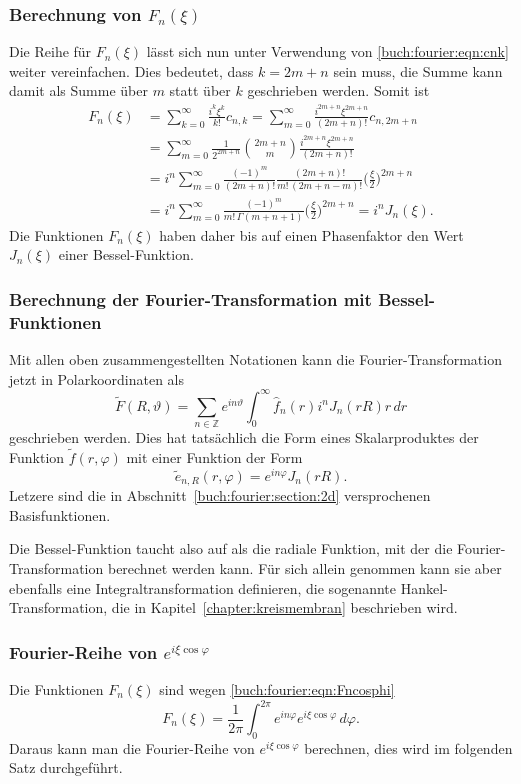 \subsubsection{Berechnung von $F_n(\xi)$}
Die Reihe für $F_n(\xi)$ lässt sich nun unter Verwendung
von \eqref{buch:fourier:eqn:cnk} weiter vereinfachen.
Dies bedeutet, dass $k=2m+n$ sein muss, die Summe kann damit als
Summe über $m$ statt über $k$ geschrieben werden.
Somit ist
\begin{align*}
F_n(\xi)
&=
\sum_{k=0}^\infty
\frac{i^k\xi^k}{k!}
c_{n,k}
=
\sum_{m=0}^\infty
\frac{i^{2m+n}\xi^{2m+n}}{(2m+n)!}
c_{n,2m+n}
\\
&=
\sum_{m=0}^\infty
\frac{1}{2^{2m+n}}
\binom{2m+n}{m}
\frac{i^{2m+n}\xi^{2m+n}}{(2m+n)!}
\\
&=
i^n
\sum_{m=0}^\infty
\frac{(-1)^m}{(2m+n)!}
\frac{(2m+n)!}{m!\,(2m+n-m)!}
\biggl(\frac{\xi}{2}\biggr)^{2m+n}
\\
&=
i^n
\sum_{m=0}^\infty
\frac{(-1)^m}
{m!\,\Gamma(m+n+1)}
\biggl(\frac{\xi}{2}\biggr)^{2m+n}
=
i^n J_n(\xi).
\end{align*}
Die Funktionen $F_n(\xi)$ haben daher bis auf einen Phasenfaktor den
Wert $J_n(\xi)$ einer Bessel-Funktion.

%
%
\subsubsection{Berechnung der Fourier-Transformation mit Bessel-Funktionen}
Mit allen oben zusammengestellten Notationen kann die Fourier-Transformation
jetzt in Polarkoordinaten als
\[
\tilde{F}(R,\vartheta)
=
\sum_{n\in\mathbb{Z}}
e^{in\vartheta}
\int_0^\infty 
\hat{f}_n(r)
i^n
J_n(rR)
r\,dr
\]
geschrieben werden.
Dies hat tatsächlich die Form eines Skalarproduktes der Funktion
$\tilde{f}(r,\varphi)$ mit einer Funktion der Form
\[
\tilde{e}_{n,R}(r,\varphi)
=
e^{in\varphi}
J_n(rR).
\]
Letzere sind die in Abschnitt~\ref{buch:fourier:section:2d}
versprochenen Basisfunktionen.

Die Bessel-Funktion taucht also auf als die radiale Funktion,
mit der die Fourier-Transformation berechnet werden kann.
Für sich allein genommen kann sie aber ebenfalls eine Integraltransformation
definieren, die sogenannte Hankel-Transformation, die in
Kapitel~\ref{chapter:kreismembran} beschrieben wird.

%
%
\subsubsection{Fourier-Reihe von $e^{i\xi\cos\varphi}$}
Die Funktionen $F_n(\xi)$ sind wegen \eqref{buch:fourier:eqn:Fncosphi}
\[
F_n(\xi)
=
\frac{1}{2\pi}
\int_0^{2\pi}
e^{in\varphi}
e^{i\xi\cos\varphi}
\,d\varphi.
\]
Daraus kann man die Fourier-Reihe von $e^{i\xi\cos\varphi}$ 
berechnen, dies wird im folgenden Satz durchgeführt.


